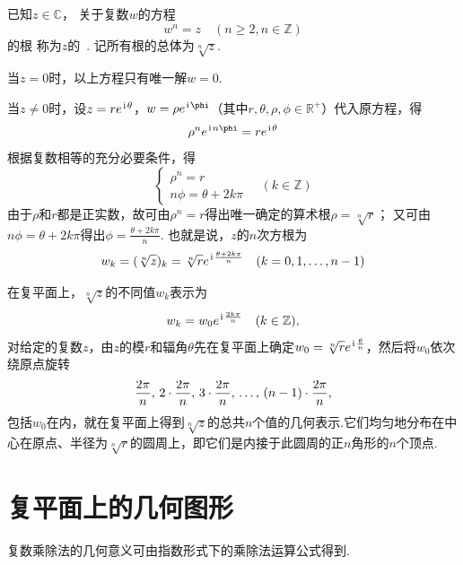 \begin{definition}%
已知\(z\in\mathbb{C}\)，
关于复数\(w\)的方程\begin{equation*}
	w^n = z \quad (n \geq 2, n \in \mathbb{Z})
\end{equation*}的根
称为\(z\)的~.
记所有根的总体为\(\sqrt[n]{z}\).

当\(z=0\)时，以上方程只有唯一解\(w = 0\).

当\(z \neq 0\)时，设\(z=re^{\kern1pt\mathrm{i}\kern1pt \theta}\)，\(w=\rho e^{\iu \phi}\)（其中\(r,\theta,\rho,\phi\in\mathbb{R}^+\)）代入原方程，得\begin{equation*}
\rho^n e^{\iu n \phi} = r e^{\iu \theta}
\end{equation*}根据复数相等的充分必要条件，得\begin{equation*}
\left\{ \begin{array}{l}
\rho^n = r \\
n\phi = \theta + 2k\pi
\end{array} \right. \quad (k \in \mathbb{Z})
\end{equation*}由于\(\rho\)和\(r\)都是正实数，故可由\(\rho^n=r\)得出唯一确定的算术根\(\rho=\sqrt[n]{r}\)；
又可由\(n\phi=\theta+2k\pi\)得出\(\phi=\frac{\theta+2k\pi}{n}\).
也就是说，\(z\)的\(n\)次方根为\begin{equation*}
w_k = (\sqrt[n]{z})_k = \sqrt[n]{r} e^{\kern1pt\mathrm{i}\kern1pt \frac{\theta + 2k\pi}{n}} \quad (k=0,1,\dotsc,n-1)
\end{equation*}
\end{definition}

在复平面上，\(\sqrt[n]{z}\)的不同值\(w_k\)表示为\begin{equation*}
w_k = w_0 e^{\kern1pt\mathrm{i}\kern1pt \frac{2k\pi}{n}} \quad (k \in \mathbb{Z}),
\end{equation*}对给定的复数\(z\)，由\(z\)的模\(r\)和辐角\(\theta\)先在复平面上确定\(w_0 = \sqrt[n]{r} e^{\kern1pt\mathrm{i}\kern1pt \frac{\theta}{n}}\)，然后将\(w_0\)依次绕原点旋转\begin{equation*}
\def\f{\frac{2\pi}{n}}
\f,\,2\cdot\f,\,3\cdot\f,\,\dots,\,(n-1)\cdot\f,
\end{equation*}包括\(w_0\)在内，就在复平面上得到\(\sqrt[n]{z}\)的总共\(n\)个值的几何表示.它们均匀地分布在中心在原点、半径为\(\sqrt[n]{r}\)的圆周上，即它们是内接于此圆周的正\(n\)角形的\(n\)个顶点.

\section{复平面上的几何图形}
复数乘除法的几何意义可由指数形式下的乘除法运算公式得到.

